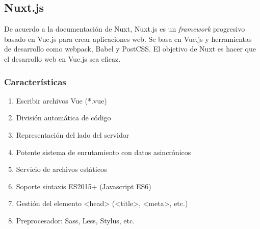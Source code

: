 \subsection*{Nuxt.js}
De acuerdo a la documentación de Nuxt\cite{noauthor_what_nodate-1}, Nuxt.js es un \textit{framework} progresivo basado en Vue.js para crear aplicaciones web. Se basa en Vue.js y herramientas de desarrollo como webpack, Babel y PostCSS. El objetivo de Nuxt es hacer que el desarrollo web en Vue.js sea eficaz.

\subsubsection*{Características}
\begin{enumerate}
    \item Escribir archivos Vue (*.vue)
    \item División automática de código
    \item Representación del lado del servidor
    \item Potente sistema de enrutamiento con datos asincrónicos
    \item Servicio de archivos estáticos
    \item Soporte sintaxis ES2015+ (Javascript ES6)
    \item Gestión del elemento <head> (<title>, <meta>, etc.)
    \item Preprocesador: Sass, Less, Stylus, etc.
\end{enumerate}
